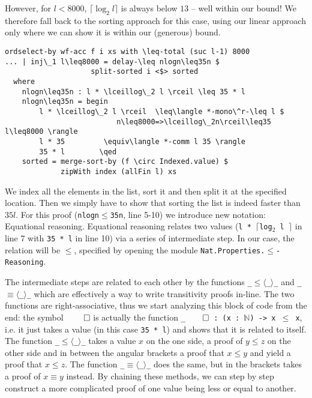 However, for $l < 8000$, $\lceil \log_2 l \rceil$ is always below $13$ -- well within our bound! We therefore fall back to the sorting approach for this case, using our linear approach only where we can show it is within our (generous) bound.

\begin{lstlisting}[caption={Quickselect ($l \leq 8000$)},label={lst:median:quickselect:small},emph={ordselect,by,split,sorted,merge,sort}]
ordselect-by wf-acc f i xs with \leq-total (suc l-1) 8000
... | inj\_1 l\leq8000 = delay-\leq nlogn\leq35n $
                    split-sorted i <$> sorted
  where
    nlogn\leq35n : l * \lceillog\_2 l \rceil \leq 35 * l
    nlogn\leq35n = begin
        l * \lceillog\_2 l \rceil  \leq\langle *-mono\^r-\leq l $
                          n\leq8000=>\lceillog\_2n\rceil\leq35 l\leq8000 \rangle
        l * 35         \equiv\langle *-comm l 35 \rangle
        35 * l        \qed
    sorted = merge-sort-by (f \circ Indexed.value) $
             zipWith index (allFin l) xs
\end{lstlisting}

We index all the elements in the list, sort it and then split it at the specified location. Then we simply have to show that sorting the list is indeed faster than $35l$. For this proof (\texttt{nlogn$\leq$35n}, line 5-10) we introduce new notation: Equational reasoning. Equational reasoning relates two values (\texttt{l * $\lceil$log$_2$ l $\rceil$} in line 7 with \texttt{35 * l} in line 10) via a series of intermediate step. In our case, the relation will be $\leq$, specified by opening the module \texttt{Nat.Properties.$\leq$-Reasoning}.

The intermediate steps are related to each other by the functions \texttt{\_$\leq$$\langle$\_$\rangle$\_} and \texttt{\_$\equiv$$\langle$\_$\rangle$\_} which are effectively a way to write transitivity proofs in-line. The two functions are right-associative, thus we start analyzing this block of code from the end: the symbol $\qed$ is actually the function \texttt{\_$\qed$ : (x : $\mathbb N$) -> x $\leq$ x}, i.e. it just takes a value (in this case \texttt{35 * l}) and shows that it is related to itself. The function \texttt{\_$\leq$$\langle$\_$\rangle$\_} takes a value $x$ on the one side, a proof of $y \leq z$ on the other side and in between the angular brackets a proof that $x \leq y$ and yield a proof that $x \leq z$. The function \texttt{\_$\equiv$$\langle$\_$\rangle$\_} does the same, but in the brackets takes a proof of $x \equiv y$ instead. By chaining these methods, we can step by step construct a more complicated proof of one value being less or equal to another.



